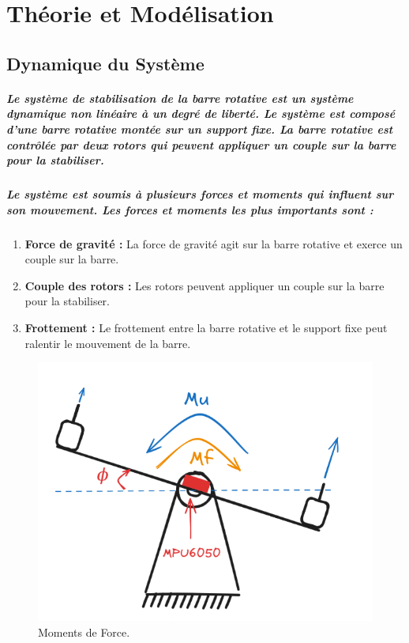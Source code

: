 \chapter{Théorie et Modélisation}
\label{chap:3-Theory}

\section{Dynamique du Système}

\paragraph{Le système de stabilisation de la barre rotative est un système dynamique non linéaire à un degré de liberté. Le système est composé d'une barre rotative montée sur un support fixe. La barre rotative est contrôlée par deux rotors qui peuvent appliquer un couple sur la barre pour la stabiliser.}

\paragraph{Le système est soumis à plusieurs forces et moments qui influent sur son mouvement. Les forces et moments les plus importants sont :}

\begin{enumerate}
	\item \textbf{Force de gravité :} La force de gravité agit sur la barre rotative et exerce un couple sur la barre.
	\item \textbf{Couple des rotors :} Les rotors peuvent appliquer un couple sur la barre pour la stabiliser.
	\item \textbf{Frottement :} Le frottement entre la barre rotative et le support fixe peut ralentir le mouvement de la barre.
\end{enumerate}

\begin{figure}[!htpb]
	\centering
	\includegraphics[width=0.6\linewidth]{Figures/moments.png}
	\caption{Moments de Force.}
\end{figure}

